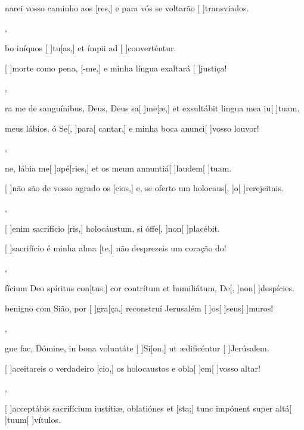 {    {\item {}narei vosso caminho aos [res,] e para vós se voltarão [ ]{trans}{vi}{a}dos.},
  {\item {}bo iníquos [ ]{tu}[as,] et ímpii ad [ ]{con}{ver}{tén}{\-tur.}}%
    {\item {}[ ]{mor}te como pena, [-me,] e minha língua exaltará [ ]{jus}{ti}ça!},
  {\item {}ra me de sanguínibus, Deus, Deus sa[ ]{me}[\-æ,] et exsultábit lingua mea iu[ ]{tu}am.}%
    {\item {} meus lábios, ó Se[, ]{pa}{ra}[ cantar,] e minha boca anunci[ ]{vos}{so lou}vor!},
  {\item {}ne, lábia me[ ]{a}{pé}[ries,] et os meum annuntiá[ ]{lau}{dem}[ ]{tu}am.}%
    {\item {}[ ]{não} são de vosso agrado os [cios,] e, se oferto um holocaus[, ]{o}[ ]{re}{rejei}tais.},
  {\item {}[ ]{e}nim sacrifício [ris,] holocáustum, si óffe[, ]{non}[ ]{pla}{cé}bit.}%
    {\item {}[ ]{sa}crifício é minha alma [te,] não desprezeis um coração do!},
  {\item {}fícium Deo spíritus con[tus,] cor contrítum et humiliátum, De[, ]{non}[ ]{de}{spíci}es.}%
    {\item {} benigno com Sião, por [ ]{gra}[ça,] reconstruí Jerusalém [ ]{os}[ ]{seus}[ ]{mu}ros!},
  {\item {}gne fac, Dómine, in bona voluntáte [ ]{Si}[\-on,] ut ædificéntur [ ]{Je}{rúsa}lem.}%
    {\item {}[ ]{a}ceitareis o verdadeiro [cio,] os holocaustos e obla[ ]{em}[ ]{vos}{so al}tar!},
  {\item {}[ ]{ac}ceptábis sacrifícium iustítiæ, oblatiónes et [\-sta;] tunc impónent super altá[ ]{tu}{um}[ ]{vítu}\-los.}%
    {}
}